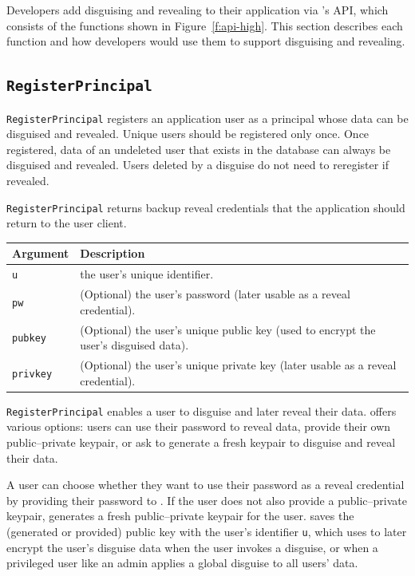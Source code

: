 Developers add disguising and revealing to their application via \sys's API,
which consists of the functions shown in Figure~\ref{f:api-high}. This section
describes each function and how developers would use them to support disguising
and revealing.

\subsection{\texttt{RegisterPrincipal}}
    \texttt{RegisterPrincipal} registers an application user as a principal
    whose data can be disguised and revealed. Unique users should be
    registered only once. Once registered, data of an undeleted user that
    exists in the database can always be disguised and revealed.  Users deleted
    by a disguise do not need to reregister if revealed.

    \texttt{RegisterPrincipal} returns backup reveal credentials that the
    application should return to the user client.

    \begin{center}
    \begin{longtable}{|m{}|m{}|}
        \hline
        \textbf{Argument} & \textbf{Description} \\
        \hline
        \texttt{u} & the user's unique identifier.\\
        \hline
        \texttt{pw} & (Optional) the user's password (later usable as a reveal credential).\\
        \hline
        \texttt{pubkey} & (Optional) the user's unique public key (used to encrypt the
        user's disguised data).\\
        \hline
        \texttt{privkey} & (Optional) the user's unique private key (later usable as a reveal
        credential).\\
        \hline
    \end{longtable}
    \end{center}
    \vspace{-24pt}

    \texttt{RegisterPrincipal} enables a user to disguise and later reveal their
    data. \sys offers various options: users can use their password
    to reveal data, provide their own public--private keypair, or ask \sys to
    generate a fresh keypair to disguise and reveal their data.

    A user can choose whether they want to use their password as a reveal
    credential by providing their password to \sys. If the user does not also
    provide a public--private keypair, \sys generates a fresh public--private
    keypair for the user. \sys saves the (generated or provided) public key
    with the user's identifier \texttt{u}, which \sys uses to later encrypt the
    user's disguise data when the user invokes a disguise, or when a privileged
    user like an admin applies a global disguise to all users' data.

